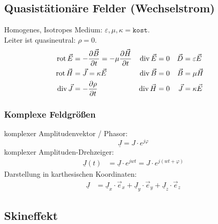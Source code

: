 \subsection{Quasistätionäre Felder (Wechselstrom)}
Homogenes, Isotropes Medium: $ \varepsilon, \mu, \kappa = \mathtt{kost.} $\\
Leiter ist quasineutral: $ \rho = 0 $.
\begin{align*}
	\operatorname{rot} \vec{E} & = -\frac{\partial \vec{B}}{\partial t} = -\mu \frac{\partial \vec{H}}{\partial t} & \operatorname{div} \vec{E} & = 0 & \vec{D} & = \varepsilon\vec{E} & \\
	\operatorname{rot} \vec{H} & = \vec{J} = \kappa \vec{E}                                                        & \operatorname{div} \vec{B} & = 0 & \vec{B} & = \mu\vec{H}         & \\
	\operatorname{div} \vec{J} & = -\frac{\partial \rho}{\partial t}                                               & \operatorname{div} \vec{H} & = 0 & \vec{J} & = \kappa \vec{E}     &
\end{align*}

\subsubsection{Komplexe Feldgrößen}
\textbullet komplexer Amplitudenvektor / Phasor:
\begin{equation*}
	\underline{J}=J\cdot e^{j\varphi}
\end{equation*}
\textbullet komplexer Amplituden-Drehzeiger:
\begin{align*}
	\underline{J}(t) & =\underline{J} \cdot e ^{jwt} = J \cdot e^{j(wt+\varphi)}
\end{align*}
\textbullet Darstellung in karthesischen Koordinaten:
\begin{align*}
	\underline{J} & =\underline{J}_x \cdot \vec{e}_x + \underline{J}_y \cdot \vec{e}_y + \underline{J}_z \cdot \vec{e}_z
\end{align*}

\subsection{Skineffekt}\label{sec:skineffekt}



